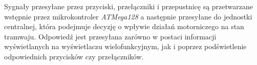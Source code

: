 \documentclass[12pt,a4paper]{article}
\begin{document}
Sygnały przesyłane przez przyciski, przełączniki i przepustnicę są przetwarzane wstępnie przez
mikrokontroler {\it ATMega128} a następnie przesyłane do jednostki centralnej, która podejmuje
decyzję o wpływie działań motorniczego na stan tramwaju. Odpowiedź jest przesyłana zarówno w postaci
informacji wyświetlanych na wyświetlaczu wielofunkcyjnym, jak i poprzez podświetlenie odpowiednich
przycisków czy przełączników.
\end{document}
